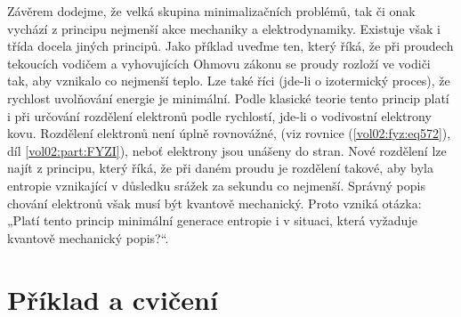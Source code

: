     Závěrem dodejme, že velká skupina minimalizačních problémů, tak či onak vychází z principu
    nejmenší akce mechaniky a elektrodynamiky. Existuje však i třída docela jiných principů. Jako
    příklad uveďme ten, který říká, že při proudech tekoucích vodičem a vyhovujících Ohmovu zákonu
    se proudy rozloží ve vodiči tak, aby vznikalo co nejmenší teplo. Lze také říci (jde-li o
    izotermický proces), že rychlost uvolňování energie je minimální. Podle klasické teorie tento
    princip platí i při určování rozdělení elektronů podle rychlostí, jde-li o vodivostní elektrony
    kovu. Rozdělení elektronů není úplně rovnovážné, (viz rovnice (\ref{vol02:fyz:eq572}), díl
    \ref{vol02:part:FYZI}), neboť elektrony jsou unášeny do stran. Nové rozdělení lze najít z principu,
    který říká, že při daném proudu je rozdělení takové, aby byla entropie vznikající v důsledku
    srážek za sekundu co nejmenší. Správný popis chování elektronů však musí být kvantově
    mechanický. Proto vzniká otázka: „Platí tento princip minimální generace entropie i v situaci,
    která vyžaduje kvantově mechanický popis?“.

  \section{Příklad a cvičení}\label{fyz:IIchapXIXsecII}

